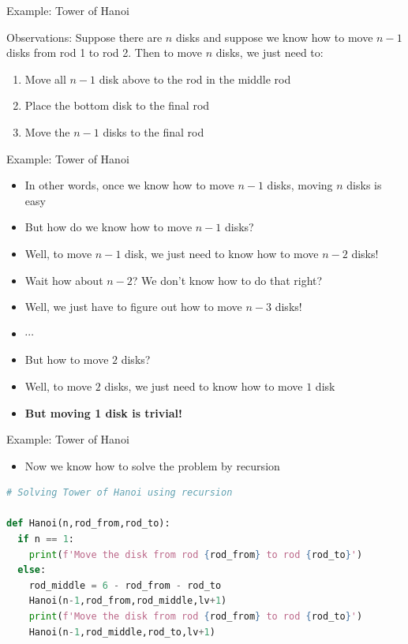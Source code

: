 \documentclass[10pt,xcolor={table,dvipsnames},t]{beamer}
\begin{document}
\begin{frame}{Example: Tower of Hanoi}
\begin{exampleblock}{Observations:}
Suppose there are $n$ disks and suppose we know how to move $n-1$ disks from rod 1 to rod 2. Then to move $n$ disks, we just need to:
\begin{enumerate}
  \item Move all $n-1$ disk above to the rod in the middle rod
  \item Place the bottom disk to the final rod
  \item Move the $n-1$ disks to the final rod 
\end{enumerate}
\end{exampleblock}
\end{frame}

\begin{frame}{Example: Tower of Hanoi}
\begin{itemize}
\item In other words, once we know how to move $n-1$ disks, moving $n$ disks is easy
\item But how do we know how to move $n-1$ disks?
\item Well, to move $n-1$ disk, we just need to know how to move $n-2$ disks!
\item Wait how about $n-2$? We don't know how to do that right?
\item Well, we just have to figure out how to move $n-3$ disks!
\item $\cdots$
\item But how to move $2$ disks?
\item Well, to move $2$ disks, we just need to know how to move $1$ disk
\item \textbf{But moving 1 disk is trivial!}
\end{itemize}
\end{frame}

\begin{frame}[fragile]{Example: Tower of Hanoi}
\begin{itemize}
\item Now we know how to solve the problem by recursion
\end{itemize}
\begin{lstlisting}[language=python]
# Solving Tower of Hanoi using recursion 

def Hanoi(n,rod_from,rod_to):
  if n == 1:
    print(f'Move the disk from rod {rod_from} to rod {rod_to}')
  else:
    rod_middle = 6 - rod_from - rod_to
    Hanoi(n-1,rod_from,rod_middle,lv+1)
    print(f'Move the disk from rod {rod_from} to rod {rod_to}')
    Hanoi(n-1,rod_middle,rod_to,lv+1)
\end{lstlisting}
\end{frame}
\end{document}

